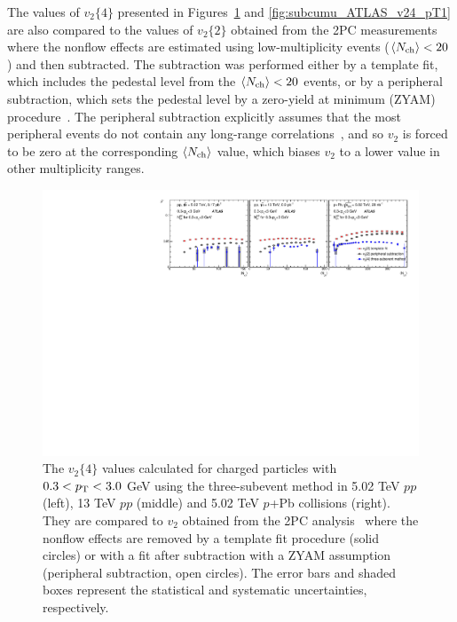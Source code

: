 The values of $v_2\{4\}$ presented in Figures~\ref{fig:subcumu_ATLAS_v24_pT0} and \ref{fig:subcumu_ATLAS_v24_pT1} are also compared to the values of $v_2\{2\}$ obtained from the 2PC measurements~\cite{Aad:2014lta, Aaboud:2016yar} where the nonflow effects are estimated using low-multiplicity events ($\left\langle N_\text{ch}\right\rangle<20$) and then subtracted. The subtraction was performed either by a template fit, which includes the pedestal level from the $\left\langle N_\text{ch}\right\rangle<20$ events, or by a peripheral subtraction, which sets the pedestal level by a zero-yield at minimum (ZYAM) procedure~\cite{Adare:2008ae}. The peripheral subtraction explicitly assumes that the most peripheral events do not contain any long-range correlations~\cite{Aaboud:2016yar}, and so $v_2$ is forced to be zero at the corresponding $\left\langle N_\text{ch}\right\rangle$ value, which biases $v_2$ to a lower value in other multiplicity ranges.

\begin{figure}[H]
\centering
\includegraphics[width=.95\linewidth]{figs/chapter_subcumu/ATLAS_v24_pT0.pdf}
\caption{The $v_2\{4\}$ values calculated for charged particles with $0.3<p_\text{T}<3.0$ GeV using the three-subevent method in 5.02 TeV $pp$ (left), 13 TeV $pp$ (middle) and 5.02 TeV $p$+Pb collisions (right). They are compared to $v_2$ obtained from the 2PC analysis~\cite{Aad:2014lta, Aaboud:2016yar} where the nonflow effects are removed by a template fit procedure (solid circles) or with a fit after subtraction with a ZYAM assumption (peripheral subtraction, open circles). The error bars and shaded boxes represent the statistical and systematic uncertainties, respectively.}
\label{fig:subcumu_ATLAS_v24_pT0}
\end{figure}

